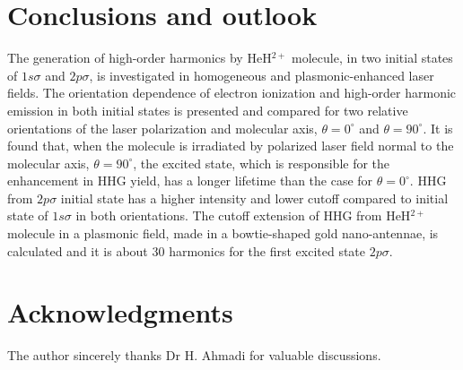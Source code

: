 \documentclass[%
reprint,
twocolumn,
 amsmath,amssymb,
 aps,
pra,
 showpacs
]{revtex4-1}
\begin{document}
\section{Conclusions and outlook}
The generation of high-order harmonics by HeH$^{2+}$ molecule, in two initial states of $1s\sigma$ and $2p\sigma$, is investigated in homogeneous and plasmonic-enhanced laser fields. The orientation dependence of electron ionization and high-order harmonic emission in both initial states is presented and compared for two relative orientations of the laser polarization and molecular axis, $\theta=0^{\circ}$ and $\theta=90^{\circ}$.  It is found that, when the molecule is irradiated by polarized laser field normal to the molecular axis, $\theta=90^{\circ}$, the excited state, which is responsible for the enhancement in HHG yield, has a longer lifetime than the case for $\theta=0^{\circ}$. HHG from $2p\sigma$ initial state has a higher intensity and lower cutoff compared to initial state of $1s\sigma$ in both orientations.
The cutoff extension of HHG from HeH$^{2+}$ molecule in a plasmonic field, made in a bowtie-shaped gold nano-antennae, is calculated and it is about 30 harmonics for the first excited state $2p\sigma$.
\section{Acknowledgments}
The author sincerely thanks Dr H. Ahmadi for valuable discussions.
\end{document}
